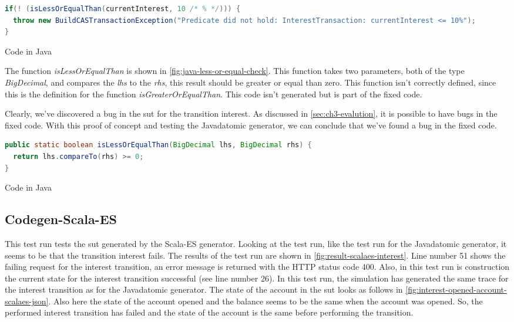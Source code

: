 \begin{sourcecode}[h!]
\begin{lstlisting}[language=Java]
if(! (isLessOrEqualThan(currentInterest, 10 /* % */))) {
  throw new BuildCASTransactionException("Predicate did not hold: InterestTransaction: currentInterest <= 10%");
}
\end{lstlisting}
\caption{Code in Java}\label{fig:java-gen-interest-pre}
\end{sourcecode}
\FloatBarrier

The function \textit{isLessOrEqualThan} is shown in
\autoref{fig:java-less-or-equal-check}. This function takes two parameters, both
of the type \textit{BigDecimal}, and compares the \textit{lhs} to the
\textit{rhs}, this result should be greater or equal than zero. This function
isn't correctly defined, since this is the definition for the function
\textit{isGreaterOrEqualThan}. This code isn't generated but is part of the
fixed code.

Clearly, we've discovered a bug in the \gls{sut} for the transition
interest. As discussed in \autoref{sec:ch3-evalution}, it is possible to have
bugs in the fixed code. With this proof of concept and testing the Javadatomic
generator, we can conclude that we've found a bug in the fixed code.

\begin{sourcecode}[h!]
\begin{lstlisting}[language=Java]
public static boolean isLessOrEqualThan(BigDecimal lhs, BigDecimal rhs) {
  return lhs.compareTo(rhs) >= 0;
}
\end{lstlisting}
\caption{Code in Java}\label{fig:java-less-or-equal-check}
\end{sourcecode}
\FloatBarrier

\subsection{Codegen-Scala-ES}\label{sec:bug-interest-scalaes}

This test run tests the \gls{sut} generated by the Scala-ES generator. Looking at the
test run, like the test run for the Javadatomic generator, it seems to be
that the transition interest fails. The results of the test run are shown in
\autoref{fig:result-scalaes-interest}. Line number 51 shows the failing request
for the interest transition, an error message is returned with the HTTP status
code 400. Also, in this test run is construction the current state for the
interest transition successful (see line number 26). In this test run, the
simulation has generated the same trace for the interest transition as for the
Javadatomic generator. The state of the account in the \gls{sut} looks as follows in
\autoref{fig:interest-opened-account-scalaes-json}. Also here the state of the
account opened and the balance seems to be the same when the account was opened.
So, the performed interest transition has failed and the state of the account
is the same before performing the transition.

